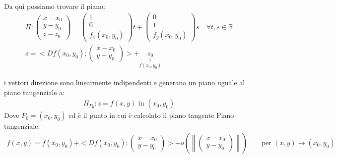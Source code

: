 \documentclass[a4paper, oneside]{article}
\begin{document}
        Da qui possiamo trovare il piano:
        \begin{gather*}
                \Pi : \begin{pmatrix}
                    x-x_0\\
                    y-y_0\\
                    z-z_0
                \end{pmatrix}= \begin{pmatrix}
                    1\\
                    0\\
                    f_x(x_0,y_0)
                \end{pmatrix}t + \begin{pmatrix}
                    0\\
                    1\\
                    f_y(x_0,y_0)
                \end{pmatrix}s \quad \forall t,s \in \mathbb{R} \\
                z = <Df(x_0,y_0);\begin{pmatrix}
                    x-x_0\\
                    y-y_0
                \end{pmatrix}> + \underset{\overset{||}{f(x_0,y_0)}}{z_0}
        \end{gather*}
        
        i vettori direzione sono linearmente indipendenti e generano un piano uguale al piano tangenziale a:
        \begin{gather*}
            \Pi_{P_0}: z{=}f(x,y) \text{ in } (x_0,y_0)
        \end{gather*}
        Dove $P_0=(x_0,y_0)$ ed è il punto in cui è calcolato il piano tangente
        Piano tangenziale:
        \begin{gather*}
            f(x,y) = f(x_0,y_0) + <Df(x_0,y_0); \begin{pmatrix} x-x_0 \\ y-y_0 \end{pmatrix}> + o\left( \left\lVert \begin{pmatrix} x-x_0 \\ y-y_0 \end{pmatrix} \right\rVert  \right) \qquad \text{per } (x,y) \to (x_0,y_0)
        \end{gather*}
\end{document}
